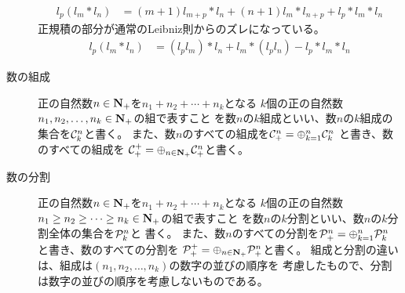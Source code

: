 \begin{description}
\begin{equation}
\begin{split}
			l_p(l_m*l_n) &= (m+1)l_{m+p}*l_n + (n+1)l_m*l_{n+p} + l_p*l_m*l_n
		\end{split}\end{equation} %
		正規積の部分が通常のLeibniz則からのズレになっている。
		\begin{equation*}\begin{split} %
			l_p(l_m*l_n) &= (l_pl_m)*l_n + l_m*(l_pl_n) - l_p*l_m*l_n
		\end{split}\end{equation*} %
		\item[数の組成] 正の自然数$n\in{\ensuremath{\mathbf{N}}}_+$を$n_1+n_2+\cdots+n_k$となる
		$k$個の正の自然数$n_1,n_2,\dots,n_k\in{\ensuremath{\mathbf{N}}}_+$の組で表すこと
		を数$n$の$k$組成といい、数$n$の$k$組成の集合を${\mathcal{C}}_k^n$と書く。
		また、数$n$のすべての組成を${\mathcal{C}}_+^n=\oplus_{k=1}^n{\mathcal{C}}_k^n$
		と書き、数のすべての組成を
		${\mathcal{C}}_+^+=\oplus_{n\in{\ensuremath{\mathbf{N}}}_+}{\mathcal{C}}_+^n$と書く。
		\item[数の分割] 正の自然数$n\in{\ensuremath{\mathbf{N}}}_+$を$n_1+n_2+\cdots+n_k$となる
		$k$個の正の自然数$n_1\ge n_2\ge\cdots\ge n_k\in{\ensuremath{\mathbf{N}}}_+$の組で表すこと
		を数$n$の$k$分割といい、数$n$の$k$分割全体の集合を${\mathcal{P}}_k^n$と
		書く。
		また、数$n$のすべての分割を${\mathcal{P}}_+^n=\oplus_{k=1}^n{\mathcal{P}}_k^n$
		と書き、数のすべての分割を
		${\mathcal{P}}_+^+=\oplus_{n\in{\ensuremath{\mathbf{N}}}_+}{\mathcal{P}}_+^n$と書く。
		組成と分割の違いは、組成は$(n_1,n_2,\dots,n_k)$の数字の並びの順序を
		考慮したもので、分割は数字の並びの順序を考慮しないものである。
	\end{description} %

